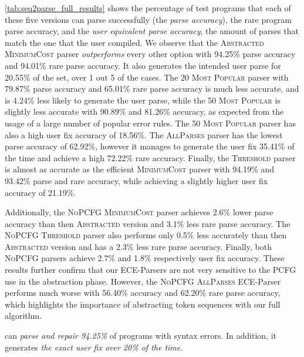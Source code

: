 \autoref{tab:seq2parse_full_results} shows the percentage of test programs that
each of these five versions can parse successfully (\ie the \emph{parse
accuracy}), the rare program parse accuracy, and the \emph{user equivalent parse
accuracy}, \ie the amount of parses that match the one that the user compiled.
We observe that the \textsc{Abstracted} \textsc{MinimumCost} parser
\emph{outperforms} every other option with 94.25\% parse accuracy and 94.01\%
rare parse accuracy. It also generates the intended user parse for 20.55\% of
the set, \ie over 1 out 5 of the cases. The \textsc{20 Most Popular} parser with
79.87\% parse accuracy and 65.01\% rare parse accuracy is much less accurate,
and is 4.24\% less likely to generate the user parse, while the \textsc{50 Most
Popular} is slightly less accurate with 90.89\% and 81.26\% accuracy, as
expected from the usage of a large number of popular error rules. The \textsc{50
Most Popular} parser has also a high user fix accuracy of 18.56\%. The
\textsc{AllParses} parser has the lowest parse accuracy of 62.92\%, however it
manages to generate the user fix 35.41\% of the time and achieve a high 72.22\%
rare accuracy. Finally, the \textsc{Threshold} parser is almost as accurate as
the efficient \textsc{MinimumCost} parser with 94.19\% and 93.42\% parse and
rare accuracy, while achieving a slightly higher user fix accuracy of 21.19\%.

Additionally, the \textsc{NoPCFG} \textsc{MinimumCost} parser achieves 2.6\%
lower parse accuracy than then \textsc{Abstracted} version and 3.1\% less rare
parse accuracy. The \textsc{NoPCFG} \textsc{Threshold} parser also performs only
0.5\% less accurately than then \textsc{Abstracted} version and has a 2.3\% less
rare parse accuracy. Finally, both \textsc{NoPCFG} parsers achieve 2.7\% and
1.8\% respectively user fix accuracy. These results further confirm that our
ECE-Parsers are not very sensitive to the PCFG use in the abstraction phase.
However, the \textsc{NoPCFG} \textsc{AllParses} ECE-Parser performs much worse
with 56.40\% accuracy and 62.20\% rare parse accuracy, which highlights the
importance of abstracting token sequences with our full algorithm.

\begin{framed}
  \noindent \toolname can \emph{parse and repair 94.25\%} of programs with
  syntax errors. In addition, it generates \emph{the exact user fix over 20\% of
  the time}.
\end{framed}

